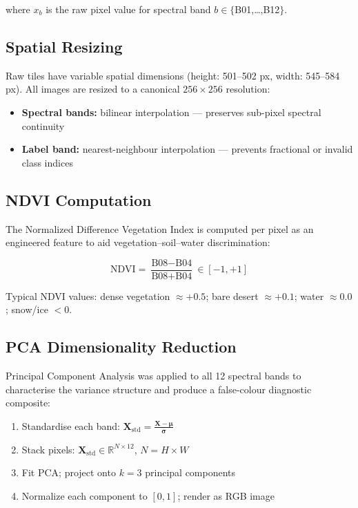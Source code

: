 \documentclass[12pt, a4paper]{article}
\begin{document}
where $x_b$ is the raw pixel value for spectral band $b \in \{$B01,\ldots,B12$\}$.

\subsection{Spatial Resizing}

Raw tiles have variable spatial dimensions (height: 501–502 px, width: 545–584 px). All images are resized to a canonical $256 \times 256$ resolution:

\begin{itemize}
  \item \textbf{Spectral bands:} bilinear interpolation — preserves sub-pixel spectral continuity
  \item \textbf{Label band:} nearest-neighbour interpolation — prevents fractional or invalid class indices
\end{itemize}

\subsection{NDVI Computation}

The Normalized Difference Vegetation Index is computed per pixel as an engineered feature to aid vegetation–soil–water discrimination:

\begin{equation}
  \text{NDVI} = \frac{\text{B08} - \text{B04}}{\text{B08} + \text{B04}}
  \in [-1, +1]
  \label{eq:ndvi}
\end{equation}

Typical NDVI values: dense vegetation $\approx +0.5$; bare desert $\approx +0.1$; water $\approx 0.0$; snow/ice $< 0$.

\subsection{PCA Dimensionality Reduction}

Principal Component Analysis was applied to all 12 spectral bands to characterise the variance structure and produce a false-colour diagnostic composite:

\begin{enumerate}
  \item Standardise each band: $\mathbf{X}_{\!\text{std}} = \frac{\mathbf{X} - \boldsymbol{\mu}}{\boldsymbol{\sigma}}$
  \item Stack pixels: $\mathbf{X}_{\!\text{std}} \in \mathbb{R}^{N \times 12}$, $N = H \times W$
  \item Fit PCA; project onto $k = 3$ principal components
  \item Normalize each component to $[0, 1]$; render as RGB image
\end{enumerate}
\end{document}

